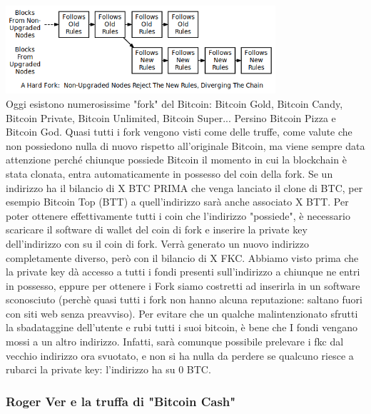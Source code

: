 \documentclass {article}
\begin{document}
\vspace {0.5cm}
\includegraphics [width = 10cm] {media/hard_fork.png}
\vspace {0.5cm}
\\
Oggi esistono numerosissime "fork" del Bitcoin: Bitcoin Gold, Bitcoin Candy, Bitcoin Private, Bitcoin Unlimited, Bitcoin Super... Persino Bitcoin Pizza e Bitcoin God.
Quasi tutti i fork vengono visti come delle truffe, come valute che non possiedono nulla di nuovo rispetto all'originale Bitcoin, ma viene sempre data attenzione perché chiunque possiede Bitcoin il momento in cui la blockchain è stata clonata, entra automaticamente in possesso del coin della fork.
Se un indirizzo ha il bilancio di X BTC PRIMA che venga lanciato il clone di BTC, per esempio Bitcoin Top (BTT) a quell'indirizzo sarà anche associato X BTT.
Per poter ottenere effettivamente tutti i coin che l'indirizzo "possiede", è necessario scaricare il software di wallet del coin di fork e inserire la private key dell'indirizzo con su il coin di fork.
Verrà generato un nuovo indirizzo completamente diverso, però con il bilancio di X FKC.
Abbiamo visto prima che la private key dà accesso a tutti i fondi presenti sull'indirizzo a chiunque ne entri in possesso, eppure per ottenere i Fork siamo costretti ad inserirla in un software sconosciuto (perchè quasi tutti i fork non hanno alcuna reputazione: saltano fuori con siti web senza preavviso).
Per evitare che un qualche malintenzionato sfrutti la sbadataggine dell'utente e rubi tutti i suoi bitcoin, è bene che I fondi vengano mossi a un altro indirizzo.
Infatti, sarà comunque possibile prelevare i fkc dal vecchio indirizzo ora svuotato, e non si ha nulla da perdere se qualcuno riesce a rubarci la private key: l'indirizzo ha su 0 BTC.


\subsubsection {Roger Ver e la truffa di "Bitcoin Cash"}
\end{document}
